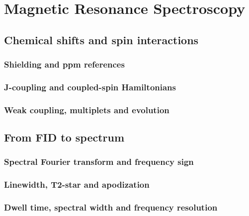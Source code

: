 \chapter{Magnetic Resonance Spectroscopy}
\label{ch:20}

\section{Chemical shifts and spin interactions}
\label{sec:20:chemical-shifts-and-spin-interactions}
\subsection{Shielding and ppm references}
\subsection{J-coupling and coupled-spin Hamiltonians}
\subsection{Weak coupling, multiplets and evolution}

\section{From FID to spectrum}
\label{sec:20:from-fid-to-spectrum}
\subsection{Spectral Fourier transform and frequency sign}
\subsection{Linewidth, T2-star and apodization}
\subsection{Dwell time, spectral width and frequency resolution}

